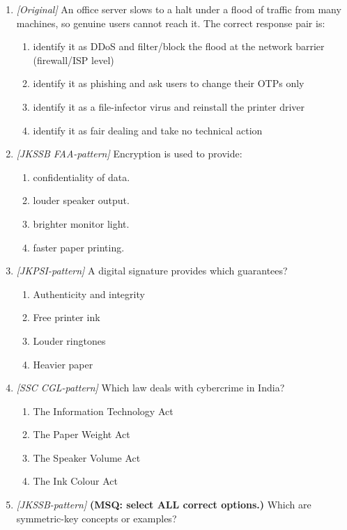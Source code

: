 \documentclass[11pt]{article}
\begin{document}
\begin{enumerate}[label=\textbf{Q\arabic*.}, leftmargin=*]
\item \textit{[Original]} An office server slows to a halt under a flood of traffic from many machines, so genuine users cannot reach it. The correct response pair is:
  \begin{enumerate}[label=\Alph*.]
    \item identify it as DDoS and filter/block the flood at the network barrier (firewall/ISP level)
    \item identify it as phishing and ask users to change their OTPs only
    \item identify it as a file-infector virus and reinstall the printer driver
    \item identify it as fair dealing and take no technical action
  \end{enumerate}

\item \textit{[JKSSB FAA-pattern]} Encryption is used to provide:
  \begin{enumerate}[label=\Alph*.]
    \item confidentiality of data.
    \item louder speaker output.
    \item brighter monitor light.
    \item faster paper printing.
  \end{enumerate}
\item \textit{[JKPSI-pattern]} A digital signature provides which guarantees?
  \begin{enumerate}[label=\Alph*.]
    \item Authenticity and integrity
    \item Free printer ink
    \item Louder ringtones
    \item Heavier paper
  \end{enumerate}
\item \textit{[SSC CGL-pattern]} Which law deals with cybercrime in India?
  \begin{enumerate}[label=\Alph*.]
    \item The Information Technology Act
    \item The Paper Weight Act
    \item The Speaker Volume Act
    \item The Ink Colour Act
  \end{enumerate}
\item \textit{[JKSSB-pattern]} \textbf{(MSQ: select ALL correct options.)} Which are symmetric-key concepts or examples?

\end{enumerate}
\end{document}
